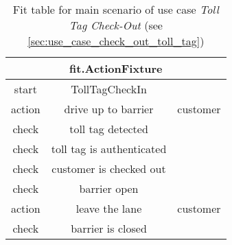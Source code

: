
\begin{table}
\begin{centering}
\begin{tabular}{|c|c|c|}
\hline 
\multicolumn{3}{|c|}{fit.ActionFixture}\tabularnewline
\hline
start & TollTagCheckIn & \tabularnewline
\hline
action & drive up to barrier & customer \tabularnewline
\hline 
check & toll tag detected &\tabularnewline
\hline 
check & toll tag is authenticated & \tabularnewline
\hline 
check & customer is checked out & \tabularnewline
\hline 
check & barrier open & \tabularnewline
\hline 
action & leave the lane & customer \tabularnewline
\hline 
check & barrier is closed & \tabularnewline
\hline 
\end{tabular}
\par\end{centering}

\caption{Fit table for main scenario of use case \emph{Toll Tag Check-Out} (see \autoref{sec:use_case_check_out_toll_tag})}
\end{table}

